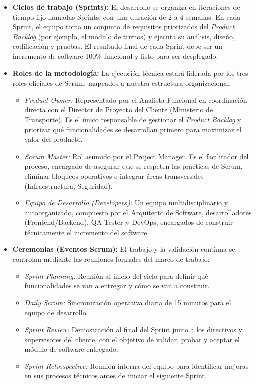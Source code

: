 \begin{itemize}
    \item \textbf{Ciclos de trabajo (Sprints):} El desarrollo se organiza en iteraciones de tiempo fijo llamadas Sprints, con una duración de 2 a 4 semanas. En cada Sprint, el equipo toma un conjunto de requisitos priorizados del \textit{Product Backlog} (por ejemplo, el módulo de turnos) y ejecuta su análisis, diseño, codificación y pruebas. El resultado final de cada Sprint debe ser un incremento de software 100\% funcional y listo para ser desplegado.
    
    \item \textbf{Roles de la metodología:} La ejecución técnica estará liderada por los tres roles oficiales de Scrum, mapeados a nuestra estructura organizacional:
    \begin{itemize}
        \item \textit{Product Owner:} Representado por el Analista Funcional en coordinación directa con el Director de Proyecto del Cliente (Ministerio de Transporte). Es el único responsable de gestionar el \textit{Product Backlog} y priorizar qué funcionalidades se desarrollan primero para maximizar el valor del producto.
        \item \textit{Scrum Master:} Rol asumido por el Project Manager. Es el facilitador del proceso, encargado de asegurar que se respeten las prácticas de Scrum, eliminar bloqueos operativos e integrar áreas transversales (Infraestructura, Seguridad).
        \item \textit{Equipo de Desarrollo (Developers):} Un equipo multidisciplinario y autoorganizado, compuesto por el Arquitecto de Software, desarrolladores (Frontend/Backend), QA Tester y DevOps, encargados de construir técnicamente el incremento del software.
    \end{itemize}
    
    \item \textbf{Ceremonias (Eventos Scrum):} El trabajo y la validación continua se controlan mediante las reuniones formales del marco de trabajo:
    \begin{itemize}
        \item \textit{Sprint Planning:} Reunión al inicio del ciclo para definir qué funcionalidades se van a entregar y cómo se van a construir.
        \item \textit{Daily Scrum:} Sincronización operativa diaria de 15 minutos para el equipo de desarrollo.
        \item \textit{Sprint Review:} Demostración al final del Sprint junto a los directivos y supervisores del cliente, con el objetivo de validar, probar y aceptar el módulo de software entregado.
        \item \textit{Sprint Retrospective:} Reunión interna del equipo para identificar mejoras en sus procesos técnicos antes de iniciar el siguiente Sprint.
    \end{itemize}
\end{itemize}


